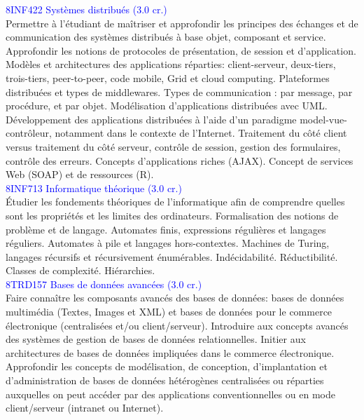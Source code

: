 \textcolor{blue}{8INF422 Systèmes distribués (3.0 cr.)}\\

Permettre à l'étudiant de maîtriser et approfondir les principes des échanges et de communication des systèmes distribués à base objet, composant et service. Approfondir les notions de protocoles de présentation, de session et d'application. Modèles et architectures des applications réparties: client-serveur, deux-tiers, trois-tiers, peer-to-peer, code mobile, Grid et cloud computing. Plateformes distribuées et types de middlewares. Types de communication : par message, par procédure, et par objet. 
Modélisation d'applications distribuées avec UML. Développement des applications distribuées à l'aide d'un paradigme model-vue-contrôleur, notamment dans le contexte de l'Internet. Traitement du côté client versus traitement du côté serveur, contrôle de session, gestion des formulaires, contrôle des erreurs. Concepts d'applications riches (AJAX). Concept de services Web (SOAP) et de ressources (R).\\

\textcolor{blue}{8INF713 Informatique théorique (3.0 cr.)}\\

Étudier les fondements théoriques de l'informatique afin de comprendre quelles sont les propriétés et les limites des ordinateurs.
Formalisation des notions de problème et de langage. Automates finis, expressions régulières
et langages réguliers. Automates à pile et langages hors-contextes. Machines de Turing,
langages récursifs et récursivement énumérables. Indécidabilité. Réductibilité. Classes de
complexité. Hiérarchies.\\

\textcolor{blue}{8TRD157 Bases de données avancées (3.0 cr.)}\\

Faire connaître les composants avancés des bases de données: bases de données
multimédia (Textes, Images et XML) et bases de données pour le commerce électronique
(centralisées et/ou client/serveur). Introduire aux concepts avancés des systèmes de gestion
de bases de données relationnelles. Initier aux architectures de bases de données impliquées
dans le commerce électronique. Approfondir les concepts de modélisation, de conception,
d'implantation et d'administration de bases de données hétérogènes centralisées ou réparties auxquelles on peut accéder par des applications conventionnelles ou en mode client/serveur (intranet ou Internet).\\

